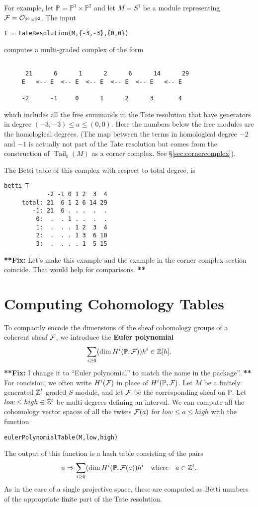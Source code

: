\documentclass[twoside,12pt, leqno]{amsart}
\def\PP{{\mathbb P}}
\def\fix#1{{\bf ***Fix:} #1 {\bf ***}}
\begin{document}
For example, let $\PP=\PP^1\times \PP^2$ and let $M=S^1$ be a module representing $\sF=\cO_{\PP^1\times \PP^2}$.  The input
\begin{verbatim}
T = tateResolution(M,{-3,-3},{0,0})
\end{verbatim}
computes a multi-graded complex of the form
{\small \begin{verbatim}

      21      6      1      2      6      14      29
     E   <-- E  <-- E  <-- E  <-- E  <-- E   <-- E
                                                      
     -2      -1     0      1      2      3       4
\end{verbatim}}
\noindent which includes all the free summands in the Tate resolution that have generators in degree $(-3,-3)\leq a\leq (0,0)$. Here the numbers below the free modules are the homological degrees. (The map between the terms in homological degree $-2$ and $-1$ is actually not part of the Tate resolution but  comes from the construction of $\operatorname{Tail}_b(M)$ as a corner complex. See \S\ref{sec:cornercomplex}). 

The Betti table of this complex with respect to total degree, is
\goodbreak
{\small \begin{verbatim}
betti T
            -2 -1 0 1 2  3  4
     total: 21  6 1 2 6 14 29
        -1: 21  6 . . .  .  .
         0:  .  . 1 . .  .  .
         1:  .  . . 1 2  3  4
         2:  .  . . 1 3  6 10
         3:  .  . . . 1  5 15
\end{verbatim}}
\fix{Let's make this example and the example in the corner complex section coincide.  That would help for comparisons.}

\section{Computing Cohomology Tables}\label{sec:cohom tables}
To compactly encode the dimensions of the sheaf cohomology groups of a coherent sheaf ${\mathcal F}$, we introduce the {\bf Euler polynomial}
$$
\sum_{i\geq 0} (\dim H^i(\PP, \sF))h^i\in \ZZ[h].
$$
\fix{I change it to ``Euler polynomial'' to match the name in the package''.}
For concision, we often write $H^i({\mathcal F})$ in place of $H^i(\PP, \sF)$.
Let $M$ be a finitely generated ${\mathbb Z}^t$-graded $S$-module, and let ${\mathcal F}$ be the 
corresponding sheaf on $\PP$. Let
$low\leq high\in {\mathbb Z}^t$ be multi-degrees defining an interval. We can compute
all the cohomology vector spaces of all the twists ${\mathcal F}(a)$ for $low\leq a\leq high$ with the function 
{\small \begin{verbatim}
eulerPolynomialTable(M,low,high)
\end{verbatim}}
The output of this function is a hash table consisting of the pairs
$$ 
a \Rightarrow \sum_{i\geq 0} (\dim H^i(\PP, \sF(a))h^i \ \  \text{ where }\ \  a\in \ZZ^t.
$$
As in the case of a single projective space, these are computed as Betti numbers of the appropriate finite  part of the Tate resolution.
\end{document}

